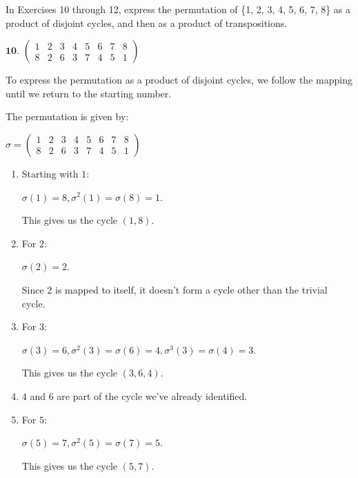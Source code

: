 \documentclass[12pt]{amsart}
\theoremstyle{definition}
\numberwithin{equation}{section}
\theoremstyle{plain}
\begin{document}
\begin{exercise}{10} In Exercises 10 through 12, express the permutation of \{1, 2, 3, 4, 5, 6, 7, 8\} as a product of disjoint cycles, and
    then as a product of transpositions.

    \(\textbf{10. }\begin{pmatrix}
        1&2&3&4&5&6&7&8\\
        8&2&6&3&7&4&5&1
    \end{pmatrix}\)

\vspace*{35pt}
    To express the permutation as a product of disjoint cycles, we follow the mapping until we return to the starting number.

    The permutation is given by:
    
    \(\sigma = \begin{pmatrix} 1&2&3&4&5&6&7&8\\ 8&2&6&3&7&4&5&1 \end{pmatrix}\)
    
    \begin{enumerate}
        \item Starting with \(1\):
        
        \( \sigma(1) = 8, \sigma^2(1) = \sigma(8) = 1\).
        
        This gives us the cycle \( (1, 8) \).
        
        \item For \(2\):
        
        \( \sigma(2) = 2\).
        
        Since \(2\) is mapped to itself, it doesn't form a cycle other than the trivial cycle.
        
        \item For \(3\):
        
        \( \sigma(3) = 6, \sigma^2(3) = \sigma(6) = 4, \sigma^3(3) = \sigma(4) = 3 \).
        
        This gives us the cycle \( (3, 6, 4) \).
        
        \item \(4\) and \(6\) are part of the cycle we've already identified.
        
        \item For \(5\):
        
        \( \sigma(5) = 7, \sigma^2(5) = \sigma(7) = 5 \).
        
        This gives us the cycle \( (5, 7) \).
        

\end{enumerate}
\end{exercise}
\end{document}
